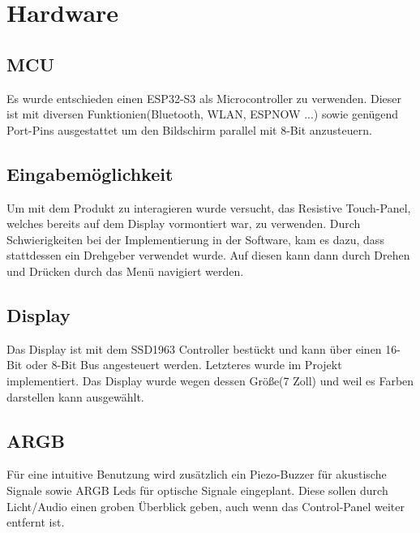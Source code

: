 \section{Hardware}


    \subsection{MCU}
    Es wurde entschieden einen ESP32-S3 als Microcontroller zu verwenden.
    Dieser ist mit diversen Funktionien(Bluetooth, WLAN, ESPNOW ...) 
    sowie genügend Port-Pins ausgestattet um den Bildschirm parallel mit 8-Bit anzusteuern.

    \subsection{Eingabemöglichkeit}
    Um mit dem Produkt zu interagieren wurde versucht, das Resistive Touch-Panel,
    welches bereits auf dem Display vormontiert war, zu verwenden. Durch Schwierigkeiten 
    bei der Implementierung in der Software, kam es dazu, dass stattdessen ein Drehgeber verwendet
    wurde. Auf diesen kann dann durch Drehen und Drücken durch das Menü navigiert werden.

    \subsection{Display}
    Das Display ist mit dem SSD1963 Controller bestückt und kann über 
    einen 16-Bit oder 8-Bit Bus angesteuert werden. Letzteres wurde
    im Projekt implementiert. Das Display wurde wegen dessen Größe(7 Zoll) und weil es Farben
    darstellen kann ausgewählt.

    \subsection{ARGB}
    Für eine intuitive Benutzung wird zusätzlich ein Piezo-Buzzer für akustische Signale 
    sowie ARGB Leds für optische Signale eingeplant. Diese sollen durch 
    Licht/Audio einen groben Überblick geben, auch wenn das Control-Panel weiter entfernt ist.
